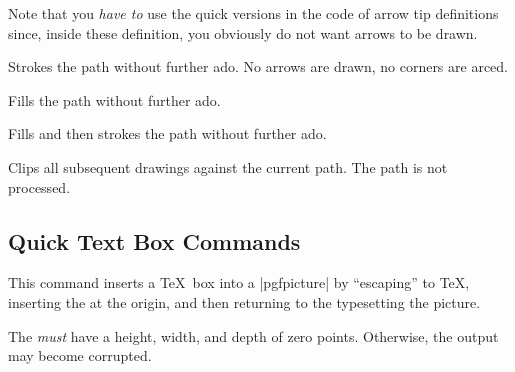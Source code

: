 Note that you \emph{have to} use the quick versions in the code of
arrow tip definitions since, inside these definition, you obviously do
not want arrows to be drawn.

\begin{command}{\pgfusepathqstroke}
  Strokes the path without further ado. No arrows are drawn, no
  corners are arced.

\begin{codeexample}[]
\begin{pgfpicture}
  \pgfpathqcircle{5pt}
  \pgfusepathqstroke
\end{pgfpicture}
\end{codeexample}
\end{command}

\begin{command}{\pgfusepathqfill}
  Fills the path without further ado.
\end{command}

\begin{command}{\pgfusepathqfillstroke}
  Fills and then strokes the path without further ado.
\end{command}

\begin{command}{\pgfusepathqclip}
  Clips all subsequent drawings against the current path. The path is
  not processed.
\end{command}


\subsection{Quick Text Box Commands}

\begin{command}{\pgfqbox{}}
  This command inserts a \TeX\ box into a |{pgfpicture}| by
  ``escaping'' to \TeX, inserting the  at the origin, and
  then returning to the typesetting the picture.

  The  \emph{must} have a height, width, and depth of zero
  points. Otherwise, the output may become corrupted.
\end{command}

